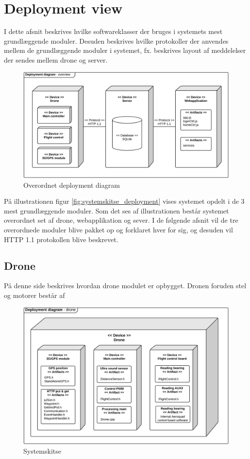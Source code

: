 \section{Deployment view}

I dette afsnit beskrives hvilke softwareklasser der bruges i systemets mest grundlæggende moduler. Desuden beskrives hvilke protokoller der anvendes mellem de grundlæggende moduler i systemet, fx. beskrives layout af meddelelser der sendes mellem drone og server.


\begin{figure}[H]
\centering
\includegraphics[width=1\textwidth]{Billeder/deployment_overview.png}
\caption{Overordnet deployment diagram}
\label{fig:deployment_generel}
\end{figure}


På illustrationen figur \ref{fig:systemskitse_deployment} vises systemet opdelt i de 3 mest grundlæggende moduler. Som det ses af illustrationen består systemet overordnet set af drone, webapplikation og sever. I de følgende afsnit vil de tre overordnede moduler blive pakket op og forklaret hver for sig, og desuden vil HTTP 1.1 protokollen blive beskrevet.



\newpage
\subsection{Drone}
På denne side beskrives hvordan drone modulet er opbygget.
Dronen foruden stel og motorer består af  

\begin{figure}[H]
\centering
\includegraphics[width=1\textwidth]{Billeder/deployment_drone.png}
\caption{Systemskitse}
\label{fig:deployment_drone}
\end{figure}

